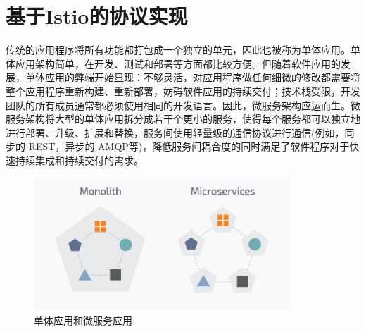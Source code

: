 \documentclass[12pt,a4paper]{article}
\begin{document}





\section{基于Istio的协议实现}\label{baseistio}
传统的应用程序将所有功能都打包成一个独立的单元，因此也被称为单体应用。单体应用架构简单，在开发、测试和部署等方面都比较方便。但随着软件应用的发展，单体应用的弊端开始显现：不够灵活，对应用程序做任何细微的修改都需要将整个应用程序重新构建、重新部署，妨碍软件应用的持续交付；技术栈受限，开发团队的所有成员通常都必须使用相同的开发语言。因此，微服务架构应运而生。微服务架构将大型的单体应用拆分成若干个更小的服务，使得每个服务都可以独立地进行部署、升级、扩展和替换，服务间使用轻量级的通信协议进行通信(例如，同步的 REST，异步的 AMQP等)，降低服务间耦合度的同时满足了软件程序对于快速持续集成和持续交付的需求。
\begin{figure}[ht]
 \centering
 \includegraphics[height=5cm]{images/Microservices-vs-Monolith.jpg}
 \caption{单体应用和微服务应用}
 \label{fig:Microservices-vs-Monolith}
\end{figure}
\end{document}
